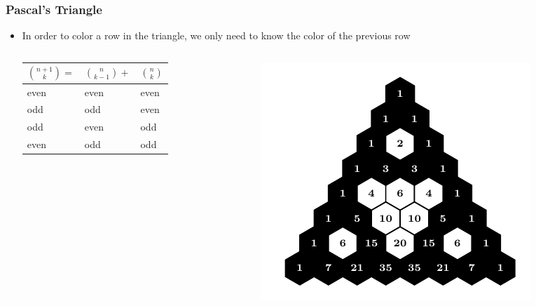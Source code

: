 \documentclass{beamer}
\begin{document}
\begin{frame}
    \frametitle{Pascal's Triangle}
    \begin{itemize}
        \item In order to color a row in the triangle, we only need to know the color of the previous row
        \begin{columns}
            \begin{column}{0.5\textwidth}
                \begin{table}[H]
                    \begin{tabular}{|lll|}
                        \hline
                        $\binom{n+1}{k} = $ & $\binom{n}{k-1} + $& $\binom{n}{k}$\\
                        \hline
                        even & even & even \\
                        odd  & odd  & even \\
                        odd  & even & odd  \\
                        even & odd & odd  \\
                        \hline
                    \end{tabular}
                \end{table}
            \end{column}
            \begin{column}{0.5\textwidth}
                \begin{figure}
                    \centering
                    \includegraphics[scale=0.7]{Mod2,7.pdf}

\end{figure}
\end{column}
\end{columns}
\end{itemize}
\end{frame}
\end{document}
